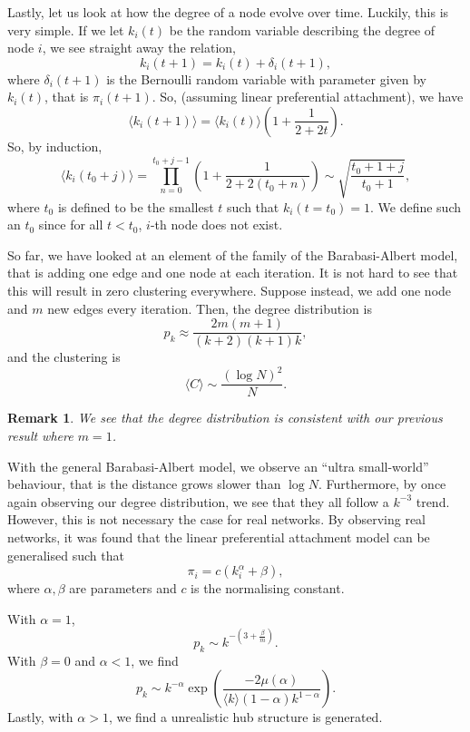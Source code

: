 \documentclass[
]{article}
\newtheorem*{remark}{Remark}
\theoremstyle{definition}
\begin{document}
Lastly, let us look at how the degree of a node evolve over time.
Luckily, this is very simple. If we let \(k_i(t)\) be the random
variable describing the degree of node \(i\), we see straight away the
relation, \[k_i(t + 1) = k_i(t) + \delta_i(t + 1),\] where
\(\delta_i(t + 1)\) is the Bernoulli random variable with parameter
given by \(k_i(t)\), that is \(\pi_i(t + 1)\). So, (assuming linear
preferential attachment), we have
\[\langle k_i(t + 1) \rangle = \langle k_i(t) \rangle\left(1 + \frac{1}{2 + 2t}\right).\]
So, by induction, \[\langle k_i(t_0 + j) \rangle = 
  \prod_{n = 0}^{t_0 + j - 1}\left( 1 + \frac{1}{2 + 2(t_0 + n)} \right)
  \sim \sqrt{\frac{t_0 + 1 + j}{t_0 + 1}},\] where \(t_0\) is defined to
be the smallest \(t\) such that \(k_i(t = t_0) = 1\). We define such an
\(t_0\) since for all \(t < t_0\), \(i\)-th node does not exist.

So far, we have looked at an element of the family of the
Barabasi-Albert model, that is adding one edge and one node at each
iteration. It is not hard to see that this will result in zero
clustering everywhere. Suppose instead, we add one node and \(m\) new
edges every iteration. Then, the degree distribution is
\[p_k \approx \frac{2m(m + 1)}{(k + 2)(k + 1)k},\] and the clustering is
\[\langle C \rangle \sim \frac{(\log N)^2}{N}.\]

\begin{remark}
  We see that the degree distribution is consistent with our previous result 
  where \(m = 1\).
\end{remark}

With the general Barabasi-Albert model, we observe an ``ultra
small-world'' behaviour, that is the distance grows slower than
\(\log N\). Furthermore, by once again observing our degree
distribution, we see that they all follow a \(k^{-3}\) trend. However,
this is not necessary the case for real networks. By observing real
networks, it was found that the linear preferential attachment model can
be generalised such that \[\pi_i = c(k_i^\alpha + \beta),\] where
\(\alpha, \beta\) are parameters and \(c\) is the normalising constant.

With \(\alpha = 1\),
\[p_k \sim k^{- \left(3 + \frac{\beta}{m}\right)}.\] With \(\beta = 0\)
and \(\alpha < 1\), we find
\[p_k \sim k^{-\alpha}\exp\left(\frac{-2 \mu(\alpha)}
{\langle k\rangle (1 - \alpha)k^{1 - \alpha}}\right).\] Lastly, with
\(\alpha > 1\), we find a unrealistic hub structure is generated.
\end{document}
